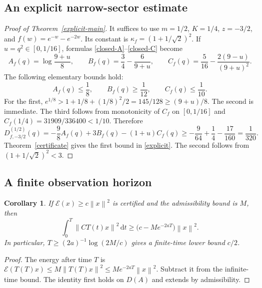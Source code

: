 \documentclass[11pt,a4paper]{article}
\newtheorem{corollary}[theorem]{Corollary}
\theoremstyle{definition}\newtheorem{definition}[theorem]{Definition}
\theoremstyle{remark}\newtheorem{remark}[theorem]{Remark}
\newcommand{\E}{\mathcal E}\newcommand{\D}{\mathcal D}
\newcommand{\dd}{\,\mathrm d}
\newcommand{\norm}[1]{\left\lVert #1\right\rVert}
\begin{document}
\subsection{An explicit narrow-sector estimate}\label{sec:explicit}
\begin{proof}[Proof of Theorem~\ref{explicit-main}]
It suffices to use $m=1/2$, $K=1/4$, $z=-3/2$, and
$f(w)=e^{-w}-e^{-2w}$. Its constant is $\kappa_f=(1+1/\sqrt2)^2$. If $u=q^2\in[0,1/16]$, formulas \eqref{closed-A}--\eqref{closed-C} become
\[
 A_f(q)=\log\frac{9+u}{8},\qquad
 B_f(q)=\frac34-\frac6{9+u},\qquad
 C_f(q)=\frac5{16}-\frac{2(9-u)}{(9+u)^2}.
\]
The following elementary bounds hold:
\[
 A_f(q)\le\frac18,\qquad B_f(q)\ge\frac1{12},\qquad
 C_f(q)\le\frac1{10}.
\]
For the first, $e^{1/8}>1+1/8+(1/8)^2/2=145/128\ge(9+u)/8$. The second is immediate. The third follows from monotonicity of $C_f$ on $[0,1/16]$ and
$C_f(1/4)=31909/336400<1/10$. Therefore
\[
 D_{f,-3/2}^{(1/2)}(q)
 =-\frac98 A_f(q)+3B_f(q)-(1+u)C_f(q)
 \ge-\frac9{64}+\frac14-\frac{17}{160}=\frac1{320}.
\]
Theorem~\ref{certificate} gives the first bound in \eqref{explicit}. The second follows from $(1+1/\sqrt2)^2<3$.
\end{proof}

\subsection{A finite observation horizon}
\begin{corollary}\label{finite-time}
If $\E(x)\ge c\norm{x}^2$ is certified and the admissibility bound is $M$, then
\[
 \int_0^T\norm{CT(t)x}^2\dd t
 \ge\bigl(c-Me^{-2aT}\bigr)\norm{x}^2.
\]
In particular, $T\ge(2a)^{-1}\log(2M/c)$ gives a finite-time lower bound $c/2$.
\end{corollary}
\begin{proof}
The energy after time $T$ is $\E(T(T)x)\le M\norm{T(T)x}^2\le Me^{-2aT}\norm{x}^2$. Subtract it from the infinite-time bound. The identity first holds on $D(A)$ and extends by admissibility.
\end{proof}
\end{document}
